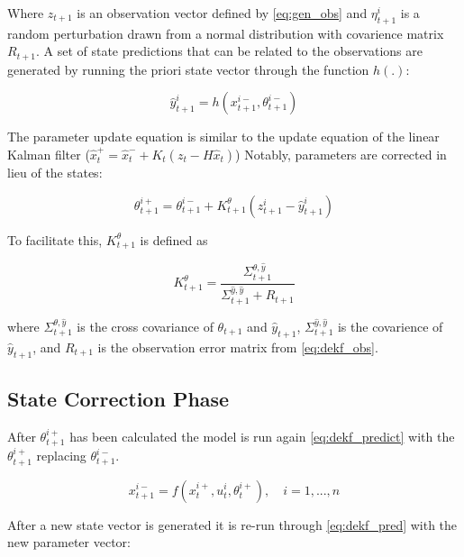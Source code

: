 \documentclass[utf8]{frontiersSCNS} %
\begin{document}
Where $z_{t+1}$ is an observation vector defined by \eqref{eq:gen_obs} and $\eta_{t+1}^{i}$ is a random perturbation drawn from a normal distribution with covarience matrix $R_{t+1}$. A set of state predictions that can be related to the observations are generated by running the priori state vector through the function $h(.)$:

\begin{equation}\label{eq:dekf_pred}
\hat{y}_{t+1}^{i} = h(x_{t+1}^{i-}, \theta_{t+1}^{i-})
\end{equation}

The parameter update equation is similar to the update equation of the linear Kalman filter ($\hat{x}^{+}_{t} = \hat{x}^{-}_{t} + K_{t}(z_{t}-H\hat{x}_{t})$) Notably,  parameters are corrected in lieu of the states:

\begin{equation}\label{eq:dekf_param_update}
\theta_{t+1}^{i+} = \theta_{t+1}^{i-} + K_{t+1}^{\theta}(z_{t+1}^{i}-\hat{y}_{t+1}^{i})
\end{equation}

To facilitate this, $K_{t+1}^{\theta}$ is defined as

\begin{equation}\label{eq:dekf_param_k}
K_{t+1}^{\theta} = \frac{\Sigma^{\theta,\hat{y}}_{t+1}}{\Sigma^{\hat{y},\hat{y}}_{t+1} + R_{t+1}}
\end{equation}

where $\Sigma^{\theta,\hat{y}}_{t+1}$ is the cross covariance of $\theta_{t+1}$ and $\hat{y}_{t+1}$, $\Sigma^{\hat{y},\hat{y}}_{t+1}$ is the covarience of $\hat{y}_{t+1}$, and $R_{t+1}$ is the observation error matrix from \eqref{eq:dekf_obs}. 

\subsection{State Correction Phase}

After $\theta_{t+1}^{i+}$ has been calculated the model is run again \eqref{eq:dekf_predict} with the $\theta_{t+1}^{i+}$ replacing $\theta_{t+1}^{i-}$.

\begin{equation}\label{eq:dekf_predict_2}
x_{t+1}^{i-} = f(x_{t}^{i+}, u_{t}^{i}, \theta^{i+}_{t}), \quad i=1,...,n
\end{equation}

After a new state vector is generated it is re-run through \eqref{eq:dekf_pred} with the new parameter vector:
\end{document}
